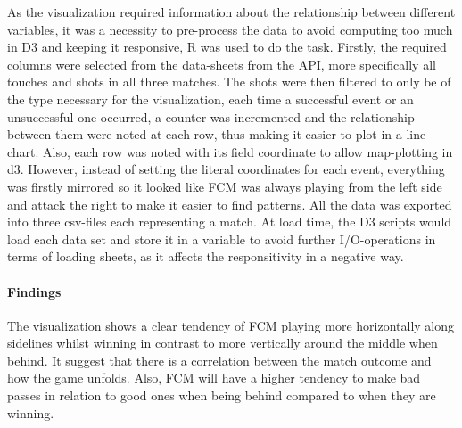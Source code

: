 \documentclass[Report.tex]{subfiles}
\begin{document}
As the visualization required information about the relationship between different variables, it was a necessity to pre-process the data to avoid computing too much in D3 and keeping it responsive, R was used to do the task. Firstly, the required columns were selected from the data-sheets from the API, more specifically all touches and shots in all three matches. The shots were then filtered to only be of the type necessary for the visualization, each time a successful event or an unsuccessful one occurred, a counter was incremented and the relationship between them were noted at each row, thus making it easier to plot in a line chart. Also, each row was noted with its field coordinate to allow map-plotting in d3. However, instead of setting the literal coordinates for each event, everything was firstly mirrored so it looked like FCM was always playing from the left side and attack the right to make it easier to find patterns. All the data was exported into three csv-files each representing a match. At load time, the D3 scripts would load each data set and store it in a variable to avoid further I/O-operations in terms of loading sheets, as it affects the responsitivity in a negative way. 

\paragraph{Findings \\}
The visualization shows a clear tendency of FCM playing more horizontally along sidelines whilst winning in contrast to more vertically around the middle when behind. It suggest that there is a correlation between the match outcome and how the game unfolds. Also, FCM will have a higher tendency to make bad passes in relation to good ones when being behind compared to when they are winning.
	
\end{document}
